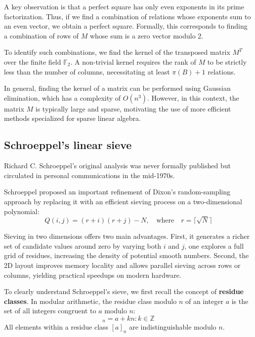 \documentclass[a4paper, 11pt]{article}
\begin{document}
A key observation is that a perfect square has only even exponents in its prime factorization. Thus, if we find a combination of relations whose exponents sum to an even vector, we obtain a perfect square. Formally, this corresponds to finding a combination of rows of $M$ whose sum is a zero vector modulo 2.

To identify such combinations, we find the kernel of the transposed matrix $M^T$ over the finite field $\mathbb{F}_2$. A non-trivial kernel requires the rank of $M$ to be strictly less than the number of columns, necessitating at least $\pi(B)+1$ relations.

In general, finding the kernel of a matrix can be performed using Gaussian elimination, which has a complexity of $O(n^3)$. However, in this context, the matrix $M$ is typically large and sparse, motivating the use of more efficient methods specialized for sparse linear algebra.

\subsection{Schroeppel's linear sieve}
Richard C. Schroeppel's original analysis was never formally published but circulated in personal communications in the mid-1970s.

Schroeppel proposed an important refinement of Dixon's random-sampling approach by replacing it with an efficient sieving process on a two-dimensional polynomial:
\begin{equation}
Q(i,j) = (r+i)(r+j) - N, \quad \text{where} \quad r = \bigl\lceil\sqrt{N}\bigr\rceil
\end{equation}

Sieving in two dimensions offers two main advantages. First, it generates a richer set of candidate values around zero by varying both $i$ and $j$, one explores a full grid of residues, increasing the density of potential smooth numbers. Second, the 2D layout improves memory locality and allows parallel sieving across rows or columns, yielding practical speedups on modern hardware.

To clearly understand Schroeppel's sieve, we first recall the concept of \textbf{residue classes}. In modular arithmetic, the residue class modulo $n$ of an integer $a$ is the set of all integers congruent to $a$ modulo $n$:
\begin{equation}
[a]_n = { a + kn : k \in \mathbb{Z}}
\end{equation}
All elements within a residue class $[a]_n$ are indistinguishable modulo $n$.
\end{document}
